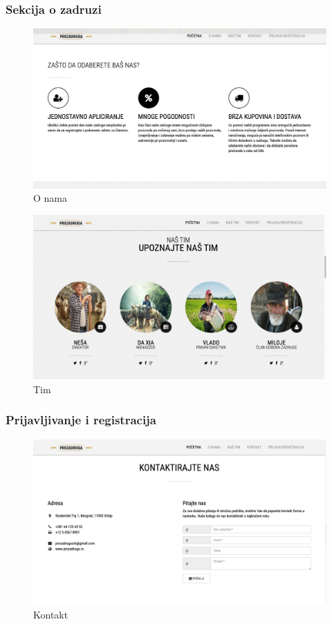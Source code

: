 \documentclass[a4paper]{article}
\begin{document}
\newpage
\subsubsection{Sekcija o zadruzi}
\begin{figure}[h!]
    \centering
    \includegraphics[scale=0.3]{images/about.png}
    \caption{O nama}
    \label{about}
\end{figure}

\begin{figure}[h!]
    \centering
    \includegraphics[scale=0.3]{images/team.png}
    \caption{Tim}
    \label{team}
\end{figure}

\newpage
\subsubsection{Prijavljivanje i registracija}
\begin{figure}[h!]
    \centering
    \includegraphics[scale=0.3]{images/contact.png}
    \caption{Kontakt}
    \label{contact}
\end{figure}
\end{document}
